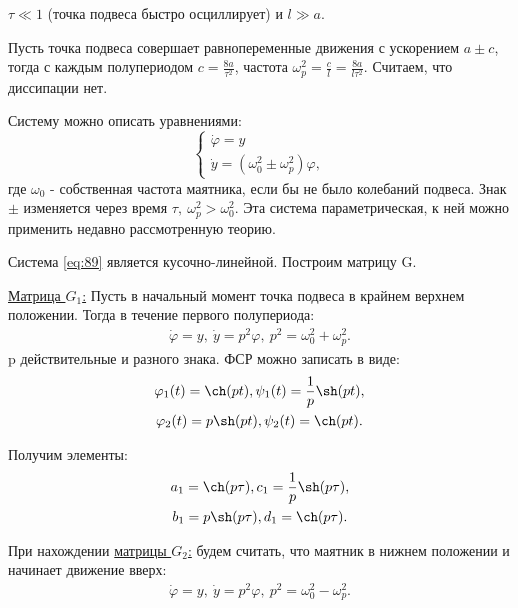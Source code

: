 
$\tau \ll 1$ (точка подвеса быстро осциллирует) и $l\gg a$.

Пусть точка подвеса совершает равнопеременные движения с ускорением $a \pm c$, тогда с каждым полупериодом $c=\frac{8a}{\tau^2}$, частота $\omega_p^2=\frac{c}{l}=\frac{8a}{l\tau^2}$. Считаем, что диссипации нет. 

Систему можно описать уравнениями:
\begin{equation}
	\begin{cases}
		\dot{\varphi}=y \\
		\dot{y}=(\omega_0^2 \pm \omega_p^2)	\varphi,
	\end{cases}
	\label{eq:89}	
\end{equation}
где $\omega_0$ - собственная частота маятника, если бы не было колебаний подвеса. Знак $\pm$ изменяется через время $\tau,~ \omega_p^2>\omega_0^2$. Эта система параметрическая, к ней можно применить недавно рассмотренную теорию. 

Система  \eqref{eq:89} является кусочно-линейной. Построим матрицу G.

\underline{Матрица $G_1$:}
Пусть в начальный момент точка подвеса в крайнем верхнем положении. Тогда в течение первого полупериода:
\begin{gather*}
	\dot{\varphi}=y,~\dot{y}=p^2\varphi,~p^2=\omega_0^2 + \omega_p^2.
\end{gather*}
p действительные и разного знака. ФСР можно записать в виде:
\begin{gather}
	\phi_1(t)=\ch(pt), \psi_1(t)=\frac1{p}\sh(pt), \notag \\ 
	\phi_2(t)=p\sh(pt), \psi_2(t)=\ch(pt).		
	\label{eq:90}
\end{gather}

Получим элементы:
\begin{gather*}
	a_1=\ch(p\tau), c_1=\frac1{p}\sh(p\tau), \notag \\ 
	b_1=p\sh(p\tau), d_1=\ch(p\tau).		
\end{gather*}

При нахождении \underline{матрицы $G_2$:} будем считать, что маятник в нижнем положении и начинает движение вверх:
\begin{gather}
	\dot{\varphi}=y,~\dot{y}=p^2\varphi,~p^2=\omega_0^2 - \omega_p^2.
	\label{eq:91}
\end{gather}

